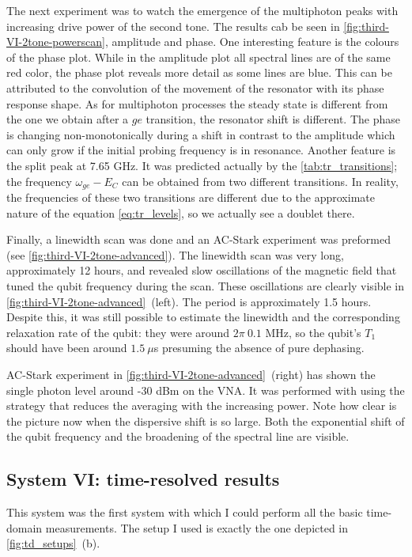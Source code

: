 \documentclass[12pt, twoside]{report}
\numberwithin{equation}{section}
\begin{document}
The next experiment was to watch the emergence of the multiphoton peaks with increasing drive power of the second tone. The results cab be seen in \autoref{fig:third-VI-2tone-powerscan}, amplitude and phase. One interesting feature is the colours of the phase plot. While in the amplitude plot all spectral lines are of the same red color, the phase plot reveals more detail as some lines are blue. This can be attributed to the convolution of the movement of the resonator with its phase response shape. As for multiphoton processes the steady state is different from the one we obtain after a $ge$ transition, the resonator shift is different. The phase is changing non-monotonically during a shift in contrast to the amplitude which can only grow if the initial probing frequency is in resonance. Another feature is the split peak at 7.65 GHz. It was predicted actually by the \autoref{tab:tr_transitions}; the frequency $\omega_{ge}-E_C$ can be obtained from two different transitions. In reality, the frequencies of these two transitions are different due to the approximate nature of the equation \eqref{eq:tr_levels}, so we actually see a doublet there.

Finally, a linewidth scan was done and an AC-Stark experiment was preformed (see \autoref{fig:third-VI-2tone-advanced}). The linewidth scan was very long, approximately 12 hours, and revealed slow oscillations of the magnetic field that tuned the qubit frequency during the scan. These oscillations are clearly visible in \autoref{fig:third-VI-2tone-advanced}~(left). The period is approximately 1.5 hours. Despite this, it was still possible to estimate the linewidth and the corresponding relaxation rate of the qubit: they were around $2\pi\ 0.1$ MHz, so the qubit's $T_1$ should have been around $1.5\ \mu$s presuming the absence of pure dephasing. 

AC-Stark experiment in \autoref{fig:third-VI-2tone-advanced}~(right) has shown the single photon level around -30 dBm on the VNA. It was performed with using the strategy that reduces the averaging with the increasing power. Note how clear is the picture now when the dispersive shift is so large. Both the exponential shift of the qubit frequency and the broadening of the spectral line are visible.


\subsection{System VI: time-resolved results}

This system was the first system with which I could perform all the basic time-domain measurements. The setup I used is exactly the one depicted in \autoref{fig:td_setups}~(b).
\end{document}
